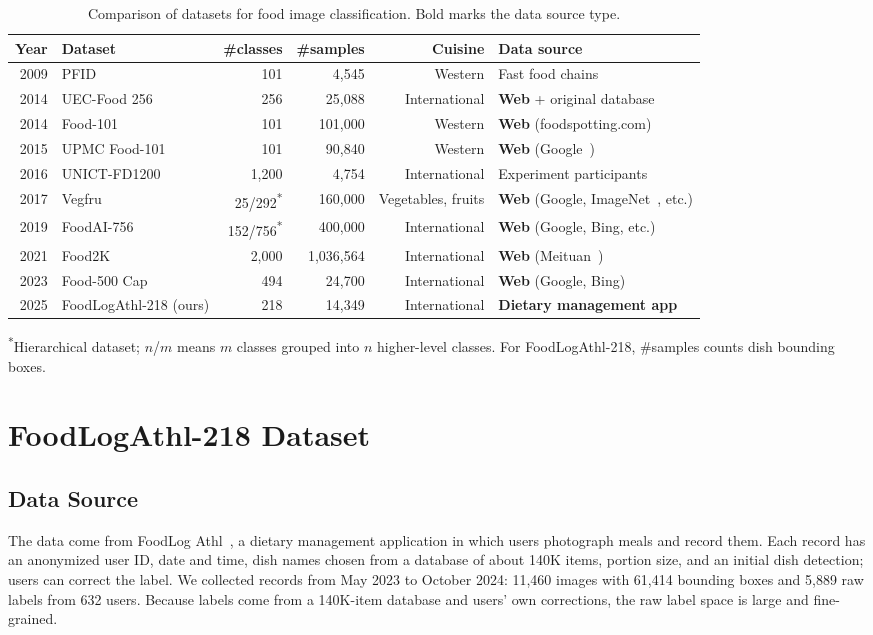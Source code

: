\documentclass[sigconf, nonacm]{acmart}
\begin{document}
\begin{table}[t]
\centering
\caption{Comparison of datasets for food image classification. Bold marks the data source type.}
\begin{tabular}{@{}rlrrrl@{}}
\toprule
Year & Dataset & \#classes & \#samples & Cuisine & Data source \\
\midrule
2009 & PFID~\cite{chen2009pfid} & 101 & 4,545 & Western & Fast food chains \\
2014 & UEC-Food 256~\cite{kawano2015automatic} & 256 & 25,088 & International & \textbf{Web} + original database \\
2014 & Food-101~\cite{bossard2014food} & 101 & 101,000 & Western & \textbf{Web} (foodspotting.com) \\
2015 & UPMC Food-101~\cite{wang2015recipe} & 101 & 90,840 & Western & \textbf{Web} (Google~\cite{google}) \\
2016 & UNICT-FD1200~\cite{farinella2016retrieval} & 1,200 & 4,754 & International & Experiment participants \\
2017 & Vegfru~\cite{hou2017vegfru} & 25/292\textsuperscript{*} & 160,000 & Vegetables, fruits & \textbf{Web} (Google, ImageNet~\cite{imagenet}, etc.) \\
2019 & FoodAI-756~\cite{sahoo2019foodai} & 152/756\textsuperscript{*} & 400,000 & International & \textbf{Web} (Google, Bing, etc.) \\
2021 & Food2K~\cite{min2023large} & 2,000 & 1,036,564 & International & \textbf{Web} (Meituan~\cite{meituan}) \\
2023 & Food-500 Cap~\cite{ma2023food} & 494 & 24,700 & International & \textbf{Web} (Google, Bing) \\
\midrule
2025 & FoodLogAthl-218 (ours) & 218 & 14,349 & International & \textbf{Dietary management app} \\
\bottomrule
\end{tabular}
\label{table:dataset_comparison}
\vspace{2pt}

\footnotesize\textsuperscript{*}Hierarchical dataset; $n$/$m$ means $m$ classes grouped into $n$ higher-level classes. For FoodLogAthl-218, \#samples counts dish bounding boxes.
\end{table}

\section{FoodLogAthl-218 Dataset}
\subsection{Data Source}
The data come from FoodLog Athl~\cite{nakamoto2022foodlog}, a dietary management application in which users photograph meals and record them. Each record has an anonymized user ID, date and time, dish names chosen from a database of about 140K items, portion size, and an initial dish detection; users can correct the label. We collected records from May 2023 to October 2024: 11,460 images with 61,414 bounding boxes and 5,889 raw labels from 632 users. Because labels come from a 140K-item database and users' own corrections, the raw label space is large and fine-grained.
\end{document}
